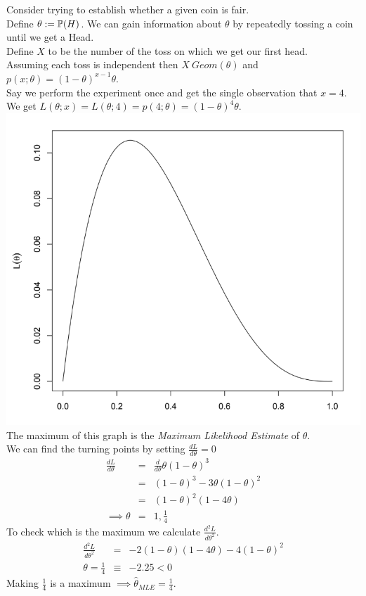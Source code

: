 \documentclass[11pt,a4paper]{article}
\begin{document}
Consider trying to establish whether a given coin is fair.\\
Define $\theta:=\mathbb{P}(H)$. We can gain information about $\theta$ by repeatedly tossing a coin until we get a Head.\\
Define $X$ to be the number of the toss on which we get our first head.\\
Assuming each toss is independent then $X~Geom(\theta)$ and $p(x;\theta)=(1-\theta)^{x-1}\theta$.\\
Say we perform the experiment once and get the single observation that $x=4$.\\
We get $L(\theta;x)=L(\theta;4)=p(4;\theta)=(1-\theta)^4\theta$.\\
\includegraphics[scale=0.25]{img/likelihoodMotivation.png}\\
The maximum of this graph is the \textit{Maximum Likelihood Estimate} of $\theta$.\\

We can find the turning points by setting $\frac{dL}{d\theta}=0$
\[\begin{array}{rcl}
\frac{dL}{d\theta}&=&\frac{d}{d\theta}\theta(1-\theta)^3\\
&=&(1-\theta)^3-3\theta(1-\theta)^2\\
&=&(1-\theta)^2(1-4\theta)\\
\implies\theta&=&1,\frac{1}{4}
\end{array}\]
To check which is the maximum we calculate $\frac{d^2L}{d\theta^2}$.
\[\begin{array}{rcl}
\frac{d^2L}{d\theta^2}&=&-2(1-\theta)(1-4\theta)-4(1-\theta)^2\\
\theta=\frac{1}{4}&\equiv&-2.25<0
\end{array}\]
Making $\frac{1}{4}$ is a maximum $\implies\hat{\theta}_{MLE}=\frac{1}{4}$.\\
\end{document}
